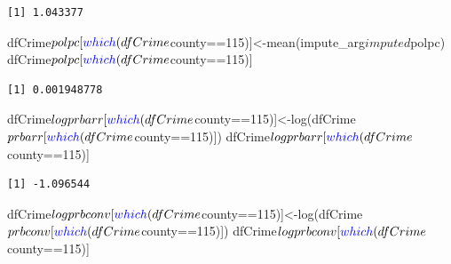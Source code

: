 \documentclass[]{article}
\newenvironment{Shaded}{}{}
\newcommand{\DecValTok}[1]{#1}
\newcommand{\KeywordTok}[1]{\textcolor[rgb]{0.00,0.00,1.00}{#1}}
\newcommand{\NormalTok}[1]{#1}
\newcommand{\OperatorTok}[1]{#1}
\begin{document}
\begin{verbatim}
[1] 1.043377
\end{verbatim}

\begin{Shaded}
\begin{Highlighting}[]
\NormalTok{dfCrime}\OperatorTok{$}\NormalTok{polpc[}\KeywordTok{which}\NormalTok{(dfCrime}\OperatorTok{$}\NormalTok{county}\OperatorTok{==}\DecValTok{115}\NormalTok{)]<-}\KeywordTok{mean}\NormalTok{(impute_arg}\OperatorTok{$}\NormalTok{imputed}\OperatorTok{$}\NormalTok{polpc)}
\NormalTok{dfCrime}\OperatorTok{$}\NormalTok{polpc[}\KeywordTok{which}\NormalTok{(dfCrime}\OperatorTok{$}\NormalTok{county}\OperatorTok{==}\DecValTok{115}\NormalTok{)]}
\end{Highlighting}
\end{Shaded}

\begin{verbatim}
[1] 0.001948778
\end{verbatim}

\begin{Shaded}
\begin{Highlighting}[]
\NormalTok{dfCrime}\OperatorTok{$}\NormalTok{logprbarr[}\KeywordTok{which}\NormalTok{(dfCrime}\OperatorTok{$}\NormalTok{county}\OperatorTok{==}\DecValTok{115}\NormalTok{)]<-}\KeywordTok{log}\NormalTok{(dfCrime}\OperatorTok{$}\NormalTok{prbarr[}\KeywordTok{which}\NormalTok{(dfCrime}\OperatorTok{$}\NormalTok{county}\OperatorTok{==}\DecValTok{115}\NormalTok{)])}
\NormalTok{dfCrime}\OperatorTok{$}\NormalTok{logprbarr[}\KeywordTok{which}\NormalTok{(dfCrime}\OperatorTok{$}\NormalTok{county}\OperatorTok{==}\DecValTok{115}\NormalTok{)]}
\end{Highlighting}
\end{Shaded}

\begin{verbatim}
[1] -1.096544
\end{verbatim}

\begin{Shaded}
\begin{Highlighting}[]
\NormalTok{dfCrime}\OperatorTok{$}\NormalTok{logprbconv[}\KeywordTok{which}\NormalTok{(dfCrime}\OperatorTok{$}\NormalTok{county}\OperatorTok{==}\DecValTok{115}\NormalTok{)]<-}\KeywordTok{log}\NormalTok{(dfCrime}\OperatorTok{$}\NormalTok{prbconv[}\KeywordTok{which}\NormalTok{(dfCrime}\OperatorTok{$}\NormalTok{county}\OperatorTok{==}\DecValTok{115}\NormalTok{)])}
\NormalTok{dfCrime}\OperatorTok{$}\NormalTok{logprbconv[}\KeywordTok{which}\NormalTok{(dfCrime}\OperatorTok{$}\NormalTok{county}\OperatorTok{==}\DecValTok{115}\NormalTok{)]}
\end{Highlighting}
\end{Shaded}
\end{document}

